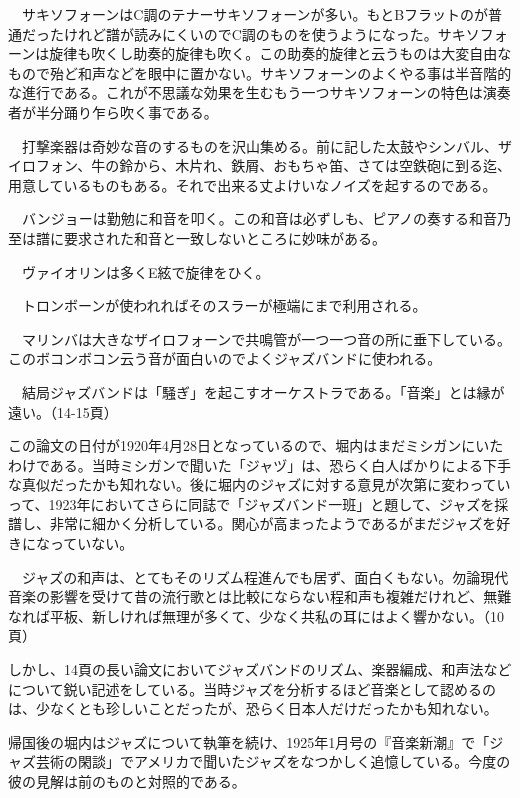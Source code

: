 \begin{gquote}
　サキソフォーンはC調のテナーサキソフォーンが多い。もとBフラットのが普通だったけれど譜が読みにくいのでC調のものを使うようになった。サキソフォーンは旋律も吹くし助奏的旋律も吹く。この助奏的旋律と云うものは大変自由なもので殆ど和声などを眼中に置かない。サキソフォーンのよくやる事は半音階的な進行である。これが不思議な効果を生むもう一つサキソフォーンの特色は演奏者が半分踊り乍ら吹く事である。\par{}　打撃楽器は奇妙な音のするものを沢山集める。前に記した太鼓やシンバル、ザイロフォン、牛の鈴から、木片れ、鉄屑、おもちゃ笛、さては空鉄砲に到る迄、用意しているものもある。それで出来る丈よけいなノイズを起するのである。\par{}　バンジョーは勤勉に和音を叩く。この和音は必ずしも、ピアノの奏する和音乃至は譜に要求された和音と一致しないところに妙味がある。\par{}　ヴァイオリンは多くE絃で旋律をひく。\par{}　トロンボーンが使われればそのスラーが極端にまで利用される。\par{}　マリンバは大きなザイロフォーンで共鳴管が一つ一つ音の所に垂下している。このボコンボコン云う音が面白いのでよくジャズバンドに使われる。\par{}　結局ジャズバンドは「騒ぎ」を起こすオーケストラである。「音楽」とは縁が遠い。（14-15頁）
\end{gquote}

この論文の日付が1920年4月28日となっているので、堀内はまだミシガンにいたわけである。当時ミシガンで聞いた「ジャヅ」は、恐らく白人ばかりによる下手な真似だったかも知れない。後に堀内のジャズに対する意見が次第に変わっていって、1923年においてさらに同誌で「ジャズバンド一班」と題して、ジャズを採譜し、非常に細かく分析している。関心が高まったようであるがまだジャズを好きになっていない。

\begin{gquote}
　ジャズの和声は、とてもそのリズム程進んでも居ず、面白くもない。勿論現代音楽の影響を受けて昔の流行歌とは比較にならない程和声も複雑だけれど、無難なれば平板、新しければ無理が多くて、少なく共私の耳にはよく響かない。（10頁）
\end{gquote}

しかし、14頁の長い論文においてジャズバンドのリズム、楽器編成、和声法などについて鋭い記述をしている。当時ジャズを分析するほど音楽として認めるのは、少なくとも珍しいことだったが、恐らく日本人だけだったかも知れない。

帰国後の堀内はジャズについて執筆を続け、1925年1月号の『音楽新潮』で「ジャズ芸術の閑談」でアメリカで聞いたジャズをなつかしく追憶している。今度の彼の見解は前のものと対照的である。

